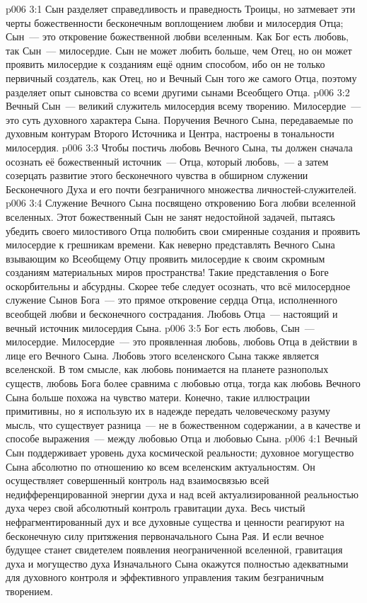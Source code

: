 \vs p006 3:1 Сын разделяет справедливость и праведность Троицы, но затмевает эти черты божественности бесконечным воплощением любви и милосердия Отца; Сын~--- это откровение божественной любви вселенным. Как Бог есть любовь, так Сын~--- милосердие. Сын не может любить больше, чем Отец, но он может проявить милосердие к созданиям ещё одним способом, ибо он не только первичный создатель, как Отец, но и Вечный Сын того же самого Отца, поэтому разделяет опыт сыновства со всеми другими сынами Всеобщего Отца.
\vs p006 3:2 Вечный Сын~--- великий служитель милосердия всему творению. Милосердие~--- это суть духовного характера Сына. Поручения Вечного Сына, передаваемые по духовным контурам Второго Источника и Центра, настроены в тональности милосердия.
\vs p006 3:3 Чтобы постичь любовь Вечного Сына, ты должен сначала осознать её божественный источник~--- Отца, который  любовь,~--- а затем созерцать развитие этого бесконечного чувства в обширном служении Бесконечного Духа и его почти безграничного множества личностей\hyp{}служителей.
\vs p006 3:4 Служение Вечного Сына посвящено откровению Бога любви вселенной вселенных. Этот божественный Сын не занят недостойной задачей, пытаясь убедить своего милостивого Отца полюбить свои смиренные создания и проявить милосердие к грешникам времени. Как неверно представлять Вечного Сына взывающим ко Всеобщему Отцу проявить милосердие к своим скромным созданиям материальных миров пространства! Такие представления о Боге оскорбительны и абсурдны. Скорее тебе следует осознать, что всё милосердное служение Сынов Бога~--- это прямое откровение сердца Отца, исполненного всеобщей любви и бесконечного сострадания. Любовь Отца~--- настоящий и вечный источник милосердия Сына.
\vs p006 3:5 Бог есть любовь, Сын~--- милосердие. Милосердие~--- это проявленная любовь, любовь Отца в действии в лице его Вечного Сына. Любовь этого вселенского Сына также является вселенской. В том смысле, как любовь понимается на планете разнополых существ, любовь Бога более сравнима с любовью отца, тогда как любовь Вечного Сына больше похожа на чувство матери. Конечно, такие иллюстрации примитивны, но я использую их в надежде передать человеческому разуму мысль, что существует разница~--- не в божественном содержании, а в качестве и способе выражения~--- между любовью Отца и любовью Сына.
\vs p006 4:1 Вечный Сын поддерживает уровень духа космической реальности; духовное могущество Сына абсолютно по отношению ко всем вселенским актуальностям. Он осуществляет совершенный контроль над взаимосвязью всей недифференцированной энергии духа и над всей актуализированной реальностью духа через свой абсолютный контроль гравитации духа. Весь чистый нефрагментированный дух и все духовные существа и ценности реагируют на бесконечную силу притяжения первоначального Сына Рая. И если вечное будущее станет свидетелем появления неограниченной вселенной, гравитация духа и могущество духа Изначального Сына окажутся полностью адекватными для духовного контроля и эффективного управления таким безграничным творением.
